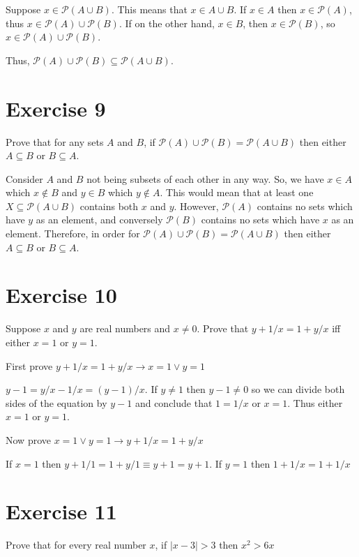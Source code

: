 \documentclass[11pt]{article}
\newcommand{\then}{\rightarrow}
\newcommand{\powerset}[1]{\mathscr{P}(#1)}
\begin{document}
Suppose $x \in \powerset{A \cup B}$. This means that $x \in A \cup B$. If 
$x \in A$ then $x \in \powerset{A}$, thus $x \in \powerset{A} \cup \powerset{B}$.
If on the other hand, $x \in B$, then $x \in \powerset{B}$, so 
$x \in \powerset{A} \cup \powerset{B}$.

Thus, $\powerset{A} \cup \powerset{B} \subseteq \powerset{A \cup B}$.

\section*{Exercise 9}

Prove that for any sets $A$ and $B$, if 
$\powerset{A} \cup \powerset{B} = \powerset{A \cup B}$
then either $A \subseteq B$ or $B \subseteq A$.

Consider $A$ and $B$ not being subsets of each other in any way. So, we have 
$x \in A$ which $x \notin B$ and $y \in B$ which $y \notin A$. This would mean
that at least one $X \subseteq \powerset{A \cup B}$ contains both $x$ and $y$.
However, $\powerset{A}$ contains no sets which have $y$ as an element, and 
conversely $\powerset{B}$ contains no sets which have $x$ as an element. 
Therefore, in order for $\powerset{A} \cup \powerset{B} = \powerset{A \cup B}$
then either $A \subseteq B$ or $B \subseteq A$.

\section*{Exercise 10}

Suppose $x$ and $y$ are real numbers and $x \neq 0$. 
Prove that $y + 1/x = 1 + y/x$ iff either $x = 1$ or $y = 1$.

First prove $y + 1/x = 1 + y/x \then x=1 \vee y=1$

$y - 1 = y / x - 1/x = (y - 1)/x$. If $y \neq 1$ then $y-1 \neq 0$ so we can 
divide both sides of the equation by $y-1$ and conclude that $1 = 1/x$ or $x=1$.
Thus either $x = 1$ or $y = 1$.

Now prove $x = 1 \vee y = 1 \then y + 1/x = 1 + y/x$

If $x = 1$ then $y + 1/1 = 1 + y/1 \equiv y + 1 = y + 1$. If $y = 1$ then 
$1 + 1/x = 1 + 1/x$

\section*{Exercise 11}

Prove that for every real number $x$, if $| x - 3 | > 3$ then $x^2 > 6x$
\end{document}
